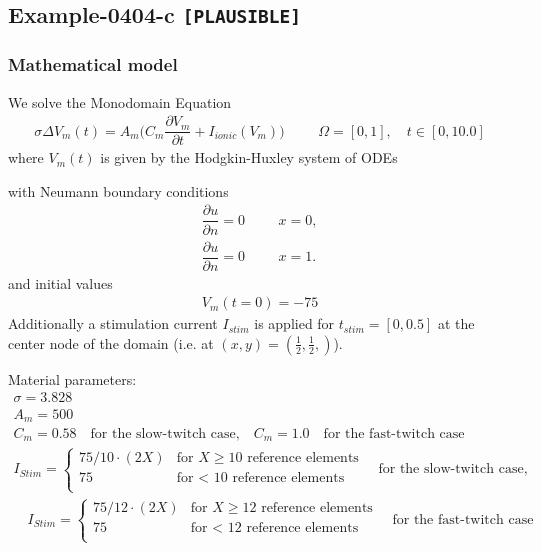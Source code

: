 %
\clearpage
%
\subsection{Example-0404-c \texttt{[PLAUSIBLE]}}
%
%
\subsubsection{Mathematical model}
%
We solve the Monodomain Equation
%
\begin{align}
    \sigma \Delta V_m(t) = A_m\Big(C_m \dfrac{\partial V_m}{\partial t} + I_{ionic}(V_m)\Big) & &&\Omega = [0, 1], \quad t \in [0, 10.0]
\end{align}
%
where $V_m(t)$ is given by the Hodgkin-Huxley system of ODEs \cite{hodgkin1952propagation}

with Neumann boundary conditions
%
\begin{align}
    \dfrac{\partial u}{\partial n} = 0 & &&x = 0,\\
    \dfrac{\partial u}{\partial n} = 0 & &&x = 1.
\end{align}
%
and initial values 
%
\begin{equation*}
  \begin{array}{lll}
    V_m(t=0) = -75
  \end{array}
\end{equation*}
%
Additionally a stimulation current $I_{stim}$ is applied for $t_{stim} = [0, 0.5]$ at the center node of the domain (i.e. at $(x,y) = (\frac12, \frac12,)$).
%

Material parameters:
\begin{equation*}
  \begin{array}{lll}
    \sigma = 3.828\\[4mm]
    A_m = 500\\[4mm]
    C_m = 0.58 \quad \text{for the slow-twitch case,} \quad C_m = 1.0 \quad \text{for the fast-twitch case}\\[4mm]
    I_{Stim} = \begin{cases}
      75/10\cdot(2X) & \text{for } X\geq 10 \text{ reference elements}\\
      75 & \text{for }< \text{ 10 reference elements}\\
    \end{cases}
     \quad \text{for the slow-twitch case,} \\
     \quad I_{Stim} = \begin{cases}
      75/12\cdot(2X) & \text{for } X\geq 12 \text{ reference elements}\\
      75 & \text{for }< \text{ 12 reference elements}\\
    \end{cases}
    \quad \text{for the fast-twitch case}\\[4mm]    
  \end{array}
\end{equation*}
%
%
